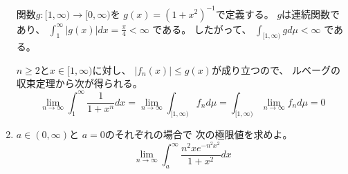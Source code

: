 \documentclass[12pt,b5paper]{ltjsarticle}
\begin{document}
\begin{enumerate}
      関数$g:[1,\infty) \to [0,\infty)$を
      $g(x)=(1+x^{2})^{-1}$で定義する。
      $g$は連続関数であり、
      $\int_{1}^{\infty}\lvert g(x) \rvert dx = \frac{\pi}{4} < \infty$
      である。
      したがって、
      $\int_{[1,\infty)} g d\mu < \infty$
      である。

      $n\geq 2$と$x\in [1,\infty)$に対し、
      $\lvert f_{n}(x) \rvert \leq g(x)$が成り立つので、
      ルベーグの収束定理から次が得られる。
      \begin{equation}
       \lim_{n\to \infty}
        \int_{1}^{\infty} \frac{1}{1+x^{n}}dx
        =
        \lim_{n\to \infty}
        \int_{[1,\infty)} f_{n} d\mu
        =
        \int_{[1,\infty)} \lim_{n\to \infty} f_{n} d\mu
        =0
      \end{equation}

      \hrulefill

 \item
      $a\in (0,\infty)$と
      $a=0$のそれぞれの場合で
      次の極限値を求めよ。
      \begin{equation}
       \lim_{n\to \infty}
        \int_{a}^{\infty} \frac{n^{2} x e^{-n^{2}x^{2}}}{1+x^{2}}dx
      \end{equation}

      \dotfill





      \hrulefill

\end{enumerate}

\hrulefill
\end{document}
